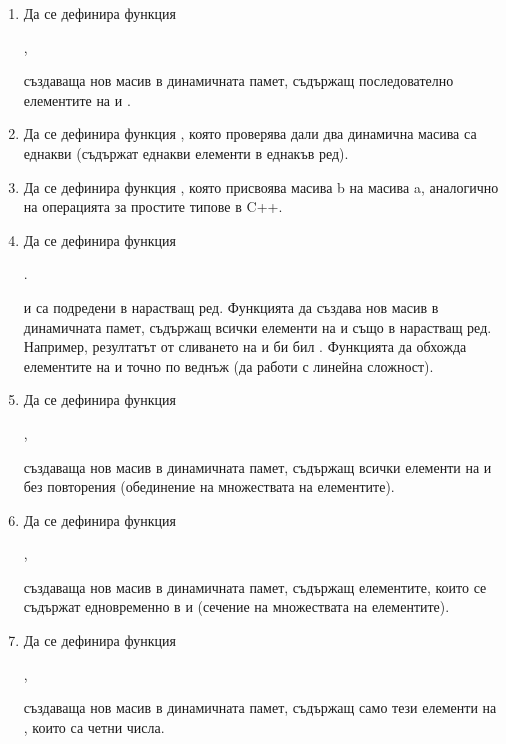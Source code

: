 {\begin{enumerate}[resume]
  \item Да се дефинира функция 
  
        ,
       
        създаваща нов масив в динамичната памет, съдържащ последователно елементите на  и .

  \item Да се дефинира функция , която проверява дали два динамична масива са еднакви (съдържат еднакви елементи в еднакъв ред).
  
  \item Да се дефинира функция , която присвоява масива b на масива a, аналогично на операцията  за простите типове в C++.
  
  \item Да се дефинира функция 

  .
  
   и  са подредени в нарастващ ред. Функцията да създава нов масив в динамичната памет, съдържащ всички елементи на  и  също в нарастващ ред. Например, резултатът от сливането на \code{[1,3,3,5]} и \code{[2,4,5]} би бил \code{[1,2,3,3,4,5,5]}. Функцията да обхожда елементите на  и  точно по веднъж (да работи с линейна сложност).

  \item Да се дефинира функция 
  
  ,
  
  създаваща нов масив в динамичната памет, съдържащ всички  елементи на  и  без повторения (обединение на множествата на елементите).

  \item Да се дефинира функция 
  
  ,
  
  създаваща нов масив в динамичната памет, съдържащ елементите, които се съдържат едновременно в  и  (сечение на множествата на елементите).

  \item Да се дефинира функция 
  
  ,
  
  създаваща нов масив в динамичната памет, съдържащ само тези елементи на , които са четни числа.


\end{enumerate}}
